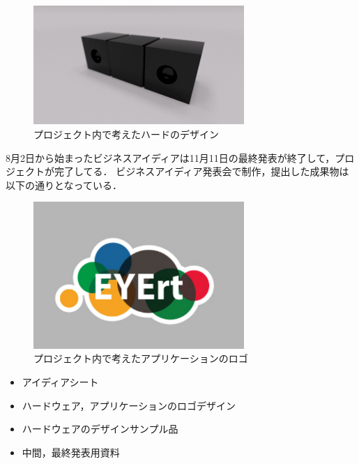 \documentclass[uplatex]{jsarticle}
\begin{document}
\begin{figure}
\vspace*{-\intextsep}
\includegraphics[width=8cm,clip]{design.pdf}
\caption{プロジェクト内で考えたハードのデザイン}\label{サンプル図}
\end{figure}

8月2日から始まったビジネスアイディアは11月11日の最終発表が終了して，プロジェクトが完了してる．
ビジネスアイディア発表会で制作，提出した成果物は以下の通りとなっている．

\begin{figure}
\vspace*{-\intextsep}
\includegraphics[width=8cm,clip]{f.pdf}
\caption{プロジェクト内で考えたアプリケーションのロゴ}\label{サンプル図}
\end{figure}

\begin{itemize}
\item アイディアシート
\item ハードウェア，アプリケーションのロゴデザイン
\item ハードウェアのデザインサンプル品
\item 中間，最終発表用資料
\end{itemize}
\end{document}
